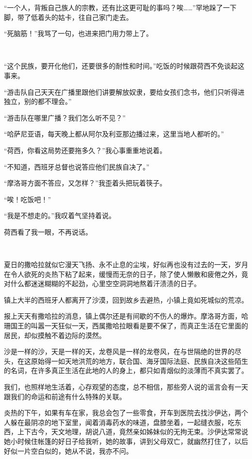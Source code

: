 \par “一个人，背叛自己族人的宗教，还有比这更可耻的事吗？唉……”罕地跺了一下脚，带了低着头的姑卡，往自己家门走去。
\par “死脑筋！”我骂了一句，也进来把门用力带上了。
\par  
\par “这个民族，要开化他们，还要很多的耐性和时间。”吃饭的时候跟荷西不免谈起这事来。
\par “游击队自己天天在广播里跟他们讲要解放奴隶，要给女孩们念书，他们只听得进独立，别的都不理会。”
\par “游击队在哪里广播？我们怎么听不见？”
\par “哈萨尼亚语，每天晚上都从阿尔及利亚那边播过来，这里当地人都听的。”
\par “荷西，你看这局势还要拖多久？”我心事重重地说着。
\par “不知道，西班牙总督也说答应他们民族自决了。”
\par “摩洛哥方面不答应，又怎样？”我歪着头把玩着筷子。
\par “唉！吃饭吧！”
\par “我是不想走的。”我叹着气坚持着说。
\par 荷西看了我一眼，不再说话。
\par  
\par 夏日的撒哈拉就似它漫天飞扬、永不止息的尘埃，好似再也没有过去的一天，岁月在令人欲死的炎热下粘了起来，缓慢而无奈的日子，除了使人懒散和疲倦之外，竟对什么都迷迷糊糊的不起劲，心里空空洞洞地熬着汗渍渍的日子。
\par 镇上大半的西班牙人都离开了沙漠，回到故乡去避热，小镇上竟如死城似的荒凉。
\par 报上天天有撒哈拉的消息，镇上偶尔还是有间歇的不伤人的爆炸。摩洛哥方面，哈珊国王的叫嚣一天狂似一天，西属撒哈拉眼看是要不保了，而真正生活在它里面的居民，却似摸触不着边际的漠然。
\par 沙是一样的沙，天是一样的天，龙卷风是一样的龙卷风，在与世隔绝的世界的尽头，在这原始得一如天地洪荒的地方，联合国、海牙国际法庭、民族自决这些陌生的名词，在许多真正生活在此地的人的身上，都只如青烟似的淡薄而不真实罢了。
\par 我们，也照样地生活着，心存观望的态度，总不相信，那些旁人说的谣言会有一天跟我们的命运和前途有什么特殊的关联。
\par 炎热的下午，如果有车在家，我总会包了一些零食，开车到医院去找沙伊达，两个人躲在最阴凉的地下室里，闻着消毒药水的味道，盘膝坐着，一起缝衣服，吃东西，上下古今，天文地理，胡说八道，竟然亲如姊妹似的无拘无束。沙伊达常常说她小时候住帐篷的好日子给我听，她的故事，讲到父母双亡，就幽然打住了，以后好似一片空白似的，她从不说，我亦不问。
